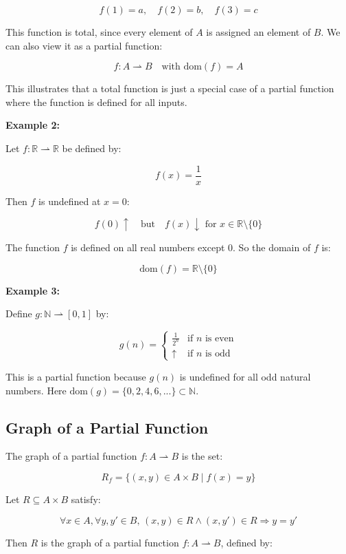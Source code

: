 \documentclass[12pt,a4paper,openany]{article}
\begin{document}
\[f(1) = a, \quad f(2) = b, \quad f(3) = c\]

This function is total, since every element of $A$ is assigned an element of $B$. We can also view it as a partial function:

\[f : A \rightharpoonup B \quad \text{with } \text{dom}(f) = A\]

This illustrates that a total function is just a special case of a partial function where the function is defined for all inputs.

\textbf{Example 2:}

Let $f : \mathbb{R} \rightharpoonup \mathbb{R}$ be defined by:

\[f(x) = \frac{1}{x}\]

Then $f$ is undefined at $x = 0$:

\[f(0) \uparrow \quad \text{but} \quad f(x) \downarrow \text{ for } x \in \mathbb{R} \setminus \{0\}\]

The function $f$ is defined on all real numbers except $0$. So the domain of $f$ is:

\[\text{dom}(f) = \mathbb{R} \setminus \{0\}\]


\textbf{Example 3:}

Define $g : \mathbb{N} \rightharpoonup [0, 1]$ by:

\[g(n) = \begin{cases} \frac{1}{2^n} & \text{if } n \text{ is even} \\ \uparrow & \text{if } n \text{ is odd} \end{cases}\]

This is a partial function because $g(n)$ is undefined for all odd natural numbers. Here $\text{dom}(g) = \{0, 2, 4, 6, ...\} \subset \mathbb{N}$.

\subsection{Graph of a Partial Function}

The graph of a partial function $f : A \rightharpoonup B$ is the set:

\[R_f = \{(x, y) \in A \times B \mid f(x) = y\}\]


Let $R \subseteq A \times B$ satisfy:

\[\forall x \in A, \forall y, y' \in B, \, (x, y) \in R \land (x, y') \in R \Rightarrow y = y'\]

Then $R$ is the graph of a partial function $f : A \rightharpoonup B$, defined by:
\end{document}
